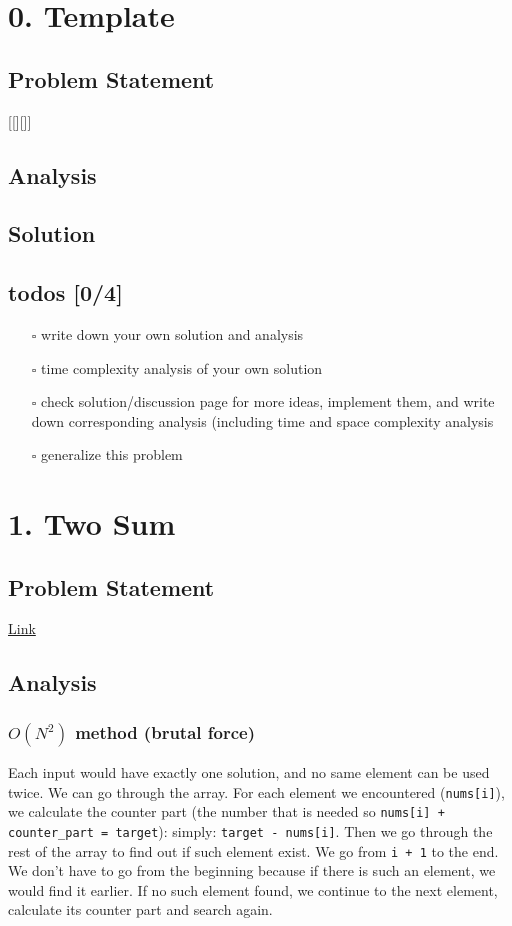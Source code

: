\documentclass[12pt]{article}
\date{\today}
\title{}
\begin{document}
\tableofcontents


\section{0. Template \label{orgb69359f}}
\label{sec:org67a8f95}
\subsection{Problem Statement}
\label{sec:orgc4399ad}
[[][]]
\subsection{Analysis}
\label{sec:org89a9a9d}

\subsection{Solution}
\label{sec:orga9de46f}

\subsection{todos [0/4]}
\label{sec:orgb65d4cf}
\begin{itemize}
\item[{$\square$}] write down your own solution and analysis
\item[{$\square$}] time complexity analysis of your own solution
\item[{$\square$}] check solution/discussion page for more ideas, implement them, and write down corresponding analysis (including time and space complexity analysis
\item[{$\square$}] generalize this problem
\end{itemize}
\section{1. Two Sum \label{org715fb1a}}
\label{sec:org3b54bde}
\subsection{Problem Statement}
\label{sec:org9876f19}
\href{https://leetcode.com/problems/two-sum/}{Link}
\subsection{Analysis}
\label{sec:orgbebe924}
\subsubsection{\(O(N^2)\) method (brutal force)}
\label{sec:org6b32394}
Each input would have exactly one solution, and no same element can be used twice. We can go through the array. For each element we encountered (\texttt{nums[i]}), we calculate the counter part (the number that is needed so \texttt{nums[i] + counter\_part = target}): simply: \texttt{target - nums[i]}. Then we go through the rest of the array to find out if such element exist. We go from \texttt{i + 1} to the end. We don't have to go from the beginning because if there is such an element, we would find it earlier. If no such element found, we continue to the next element, calculate its counter part and search again.
\end{document}
